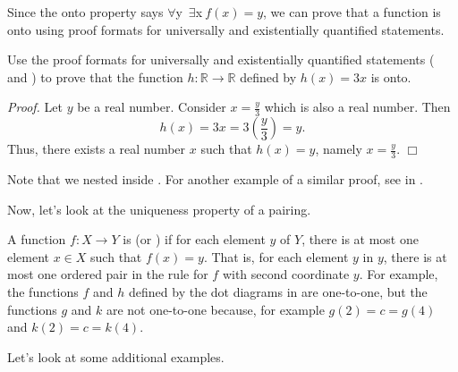 Since the onto property says $\forall $y~$ \exists $x$~ f(x)=y$, we can prove that a function is onto using proof formats for universally and existentially quantified statements.

\begin{exam}
\label{exam_proof_onto}
    Use the proof formats for universally and existentially quantified statements ( and ) to prove that the function $h: \mathbb{R} \to \mathbb{R}$ defined by $h(x) = 3x$ is onto.
        \begin{soln}
            \emph{Proof.} Let $y$ be a real number.  Consider $x = \frac{y}{3}$ which is also a real number. Then
                $$h(x) = 3x = 3\left(\frac{y}{3}\right) = y.$$
            Thus, there exists a real number $x$ such that $h(x) = y$, namely $x = \frac{y}{3}$. \hfill $\Box$

            Note that we nested  inside .  For another example of a similar proof, see  in .
        \end{soln}
\end{exam}

Now, let's look at the uniqueness property of a pairing.

\begin{defn}
\label{defn_onetoone}
    A function $f: X \to Y$ is  (or ) if for each element $y$ of $Y$, there is at most one element $x \in X$ such that $f(x) =y$. That is, for each element $y$ in $y$, there is at most one ordered pair in the rule for $f$ with second coordinate $y$. For example, the functions $f$ and $h$ defined by the dot diagrams in  are one-to-one, but the functions $g$ and $k$ are not one-to-one because, for example $g(2)=c=g(4)$ and $k(2)=c=k(4)$.
\end{defn}

Let's look at some additional examples.


